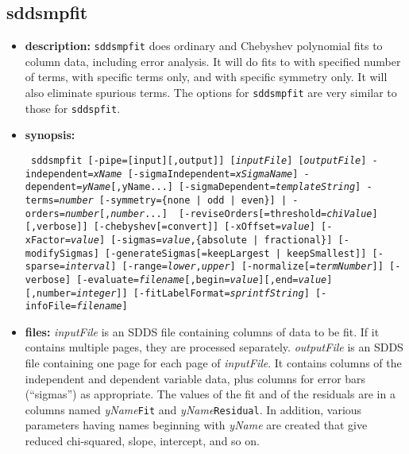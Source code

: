 \newpage
\subsection{sddsmpfit}
\label{sddsmpfit}

\begin{itemize}
\item {\bf description:} 
{\tt sddsmpfit} does ordinary and Chebyshev polynomial fits to column data, including error analysis.
It will do fits to with specified number of terms, with specific terms only, and with specific symmetry
only.  It will also eliminate spurious terms.  The options for {\tt sddsmpfit} are very similar
to those for {\tt sddspfit}.
\item {\bf synopsis:} 
\begin{flushleft}{\tt
sddsmpfit [-pipe=[input][,output]] [{\em inputFile}] [{\em outputFile}]
  -independent={\em xName} [-sigmaIndependent={\em xSigmaName}]
  -dependent={\em yName}[,{yName}...] [-sigmaDependent={\em templateString}]
  {-terms={\em number} [-symmetry=\{none | odd | even\}] | -orders={\em number}[,{\em number}...] }
  [-reviseOrders[=threshold={\em chiValue}][,verbose]] [-chebyshev[=convert]]
  [-xOffset={\em value}] [-xFactor={\em value}]
  [-sigmas={\em value},\{absolute | fractional\}] 
  [-modifySigmas] [-generateSigmas[={keepLargest | keepSmallest}]]
  [-sparse={\em interval}] [-range={\em lower},{\em upper}]
  [-normalize[={\em termNumber}]] [-verbose]
  [-evaluate={\em filename}[,begin={\em value}][,end={\em value}][,number={\em integer}]]
  [-fitLabelFormat={\em sprintfString}] [-infoFile={\em filename}]
}\end{flushleft}
\item {\bf files:}
{\em inputFile} is an SDDS file containing columns of data to be fit.
If it contains multiple pages, they are processed separately.  {\em
outputFile} is an SDDS file containing one page for each page of {\em
inputFile}.  It contains columns of the independent and dependent
variable data, plus columns for error bars (``sigmas'') as
appropriate.  The values of the fit and of the residuals are in a
columns named {\em yName}{\tt Fit} and {\em yName}{\tt Residual}.
In addition, various parameters having names beginning with 
{\em yName} are created that give reduced chi-squared, slope, intercept,
and so on.


\end{itemize}
